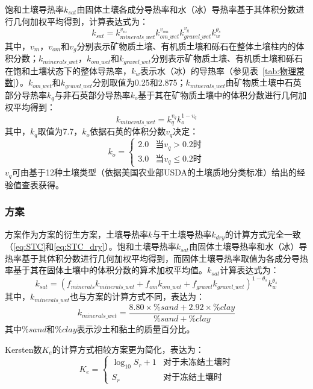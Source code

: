 饱和土壤导热率$k_{sat}$由固体土壤各成分导热率和水（冰）导热率基于其体积分数进行几何加权平均得到，计算表达式为：
\begin{equation}\label{eq:STC_wet}
k_{sat}=k_{minerals\_wet}^{v_m}k_{om\_wet}^{v_{om}}k_{gravel\_wet}^{v_g}k_w^{\theta_s}
\end{equation}
其中，$v_m$，$v_{om}$和$v_g$分别表示矿物质土壤、有机质土壤和砾石在整体土壤柱内的体积分数；$k_{minerals\_wet}$，$k_{om\_wet}$和$k_{gravel\_wet}$分别表示矿物质土壤、有机质土壤和砾石在饱和土壤状态下的整体导热率，$k_w$表示水（冰）的导热率（参见表~\ref{tab:物理常数}）。$k_{om\_wet}$和$k_{gravel\_wet}$分别取值为0.25和2.875；$k_{minerals\_wet}$由矿物质土壤中石英部分导热率$k_q$与非石英部分导热率$k_o$基于其在矿物质土壤中的体积分数进行几何加权平均得到：$$k_{minerals\_wet}=k_q^{v_q}k_o^{1-v_q}$$
其中，$k_q$取值为7.7，$k_o$依据石英的体积分数$v_q$决定：
\begin{equation}
k_o=\begin{cases}
2.0 & \text {当} v_q>0.2 \text {时} \\ 
3.0 & \text {当} v_q\leq 0.2 \text {时}
\end{cases}
\end{equation}
$v_q$可由\citet{PL_98}基于12种土壤类型（依据美国农业部USDA的土壤质地分类标准）给出的经验值查表获得。

\subsubsection{\citet{farouki1981thermal}方案}
\citet{farouki1981thermal}方案作为\citet{Johansen1975}方案的衍生方案，土壤导热率$k$与干土壤导热率$k_{dry}$的计算方式完全一致（\ref{eq:STC}和\ref{eq:STC_dry}）。饱和土壤导热率$k_{sat}$由固体土壤导热率和水（冰）导热率基于其体积分数进行几何加权平均得到，而固体土壤导热率取值为各成分导热率基于其在固体土壤中的体积分数的算术加权平均值。$k_{sat}$计算表达式为：
\begin{equation}\label{eq:STC_wet_Farouki}
k_{sat}=(f_{minerals}k_{minerals\_wet}+f_{om}k_{om\_wet}+f_{gravel}k_{gravel\_wet})^{1-\theta_s}k_w^{\theta_s}
\end{equation}
其中，$k_{minerals\_wet}$也与\citet{Johansen1975}方案的计算方式不同，表达为：$$k_{minerals\_wet}=\frac{8.80\times\%sand+2.92\times\%clay}{\%sand+\%clay}$$ 
其中$\%sand$和$\%clay$表示沙土和黏土的质量百分比。

Kersten数$K_e$的计算方式相较\citet{Johansen1975}方案更为简化，表达为：
\begin{equation}
K_e=\begin{cases}
\log_{10}S_r+1 & \text {对于未冻结土壤时} \\ 
S_r & \text {对于冻结土壤时}
\end{cases}
\end{equation}

